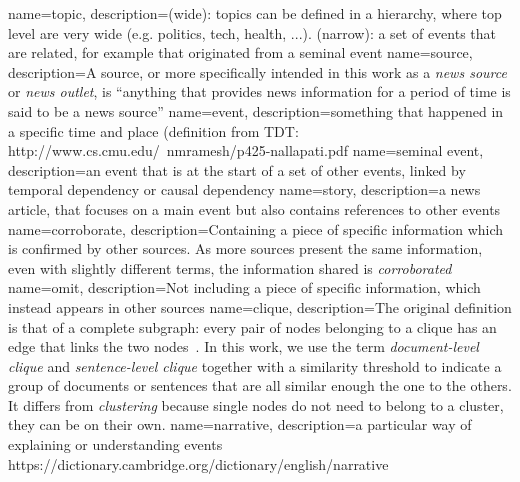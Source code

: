 


{
        name=topic,
        description={(wide): topics can be defined in a hierarchy, where top level are very wide (e.g. politics, tech, health, ...).
        (narrow): a set of events that are related, for example that originated from a seminal event}
}
{
        name=source,
        description={A source, or more specifically intended in this work as a \emph{news source} or \emph{news outlet}, is ``anything that provides news information for a period of time is said to be a news source''}
}
{
        name=event,
        description={something that happened in a specific time and place (definition from TDT: http://www.cs.cmu.edu/~nmramesh/p425-nallapati.pdf}
}
{
        name=seminal event,
        description={an event that is at the start of a set of other events, linked by temporal dependency or causal dependency}
}
{
        name=story,
        description={a news article, that focuses on a main event but also contains references to other events}
}
{
        name=corroborate,
        description={Containing a piece of specific information which is confirmed by other sources. As more sources present the same information, even with slightly different terms, the information shared is \emph{corroborated}}
}
{
        name=omit,
        description={Not including a piece of specific information, which instead appears in other sources}
}
{
        name=clique,
        description={The original definition is that of a complete subgraph: every pair of nodes belonging to a clique has an edge that links the two nodes~\citep{luce1949method}. In this work, we use the term \emph{document-level clique} and \emph{sentence-level clique} together with a similarity threshold to indicate a group of documents or sentences that are all similar enough the one to the others. It differs from \emph{clustering} because single nodes do not need to belong to a cluster, they can be on their own.}
}
{
        name=narrative,
        description={a particular way of explaining or understanding events 
            https://dictionary.cambridge.org/dictionary/english/narrative
        }
}
